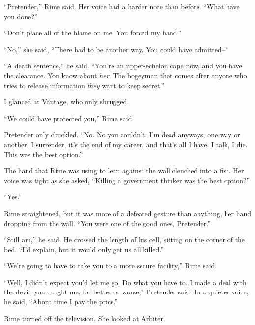 ``Pretender,'' Rime said.  Her voice had a harder note than before.  ``What have you done?''



``Don't place all of the blame on me.  You forced my hand.''



``No,'' she said, ``There had to be another way.  You could have admitted--''



``A death sentence,'' he said.  ``You're an upper-echelon cape now, and you have the clearance.  You know about \emph{her}.  The bogeyman that comes after anyone who tries to release information \emph{they} want to keep secret.''



I glanced at Vantage, who only shrugged.



``We could have protected you,'' Rime said.



Pretender only chuckled.  ``No.  No you couldn't.  I'm dead anyways, one way or another.  I surrender, it's the end of my career, and that's all I have.  I talk, I die.  This was the best option.''



The hand that Rime was using to lean against the wall clenched into a fist.  Her voice was tight as she asked, ``Killing a government thinker was the best option?''



``Yes.''



Rime straightened, but it was more of a defeated gesture than anything, her hand dropping from the wall.  ``You were one of the good ones, Pretender.''



``Still am,'' he said.  He crossed the length of his cell, sitting on the corner of the bed.  ``I'd explain, but it would only get us all killed.''



``We're going to have to take you to a more secure facility,'' Rime said.



``Well, I didn't expect you'd let me go.  Do what you have to.  I made a deal with the devil, you caught me, for better or worse,'' Pretender said.  In a quieter voice, he said, ``About time I pay the price.''



Rime turned off the television.  She looked at Arbiter.



